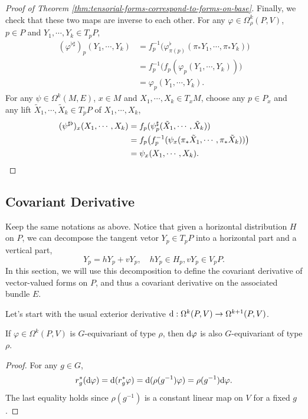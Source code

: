 \begin{proof}[Proof of Theorem \ref{thm:tensorial-forms-correspond-to-forms-on-base}]
    Finally, we check that these two maps are inverse to each other. For any $\varphi\in\Omega^k_{\rho}(P, V)$, 
    $p\in P$ and $Y_1, \cdots, Y_k\in T_pP$, 
    \begin{align*}
        (\varphi^{\flat\sharp})_p(Y_1, \cdots, Y_k) 
        &= f_p^{-1}\big(\varphi^\flat_{\pi(p)}(\pi_*Y_1, \cdots, \pi_*Y_k)\big)\\
        &= f_p^{-1}\big(f_p(\varphi_p(Y_1, \cdots, Y_k))\big)\\
        &= \varphi_p(Y_1, \cdots, Y_k).
    \end{align*}
    For any $\psi\in\Omega^k(M, E)$, $x\in M$ and $X_1, \cdots, X_k\in T_xM$, 
    choose any $p\in P_x$ and any lift $\tilde{X}_1, \cdots, \tilde{X}_k\in T_pP$ of $X_1, \cdots, X_k$, 
    \begin{align*}
        (\psi^{\sharp\flat})_x(X_1, \cdots, X_k) 
        &= f_p(\psi^\sharp_p(\tilde{X}_1, \cdots, \tilde{X}_k))\\
        &= f_p\big(f_p^{-1}(\psi_{x}(\pi_*\tilde{X}_1, \cdots, \pi_*\tilde{X}_k))\big)\\
        &= \psi_{x}(X_1, \cdots, X_k). \qedhere
    \end{align*}
\end{proof}
\subsection{Covariant Derivative}
Keep the same notations as above. Notice that given a horizontal distribution $H$ on $P$, 
we can decompose the tangent vetor $Y_p\in T_pP$ into a horizontal part and a vertical part, 
\begin{equation*}
    Y_p = hY_p + vY_p, \quad hY_p\in H_p, vY_p\in V_pP.
\end{equation*}
In this section, we will use this decomposition to define the covariant derivative of vector-valued forms on $P$, 
and thus a covariant derivative on the associated bundle $E$. 

Let's start with the usual exterior derivative ${\rm d}: \Omega^k(P, V)\to \Omega^{k+1}(P, V)$. 
\begin{proposition}\label{prop:exterior-derivative-preserves-G-equivariance}
    If $\varphi\in\Omega^k(P, V)$ is $G$-equivariant of type $\rho$, then ${\rm d}\varphi$ is also $G$-equivariant of type $\rho$.
\end{proposition}
\begin{proof}
    For any $g\in G$, 
    \begin{equation*}
        r_g^*({\rm d}\varphi) = {\rm d}(r_g^*\varphi) = {\rm d}(\rho(g^{-1})\varphi) = \rho(g^{-1}){\rm d}\varphi.
    \end{equation*}
    The last equality holds since $\rho(g^{-1})$ is a constant linear map on $V$ for a fixed $g$.
\end{proof}

